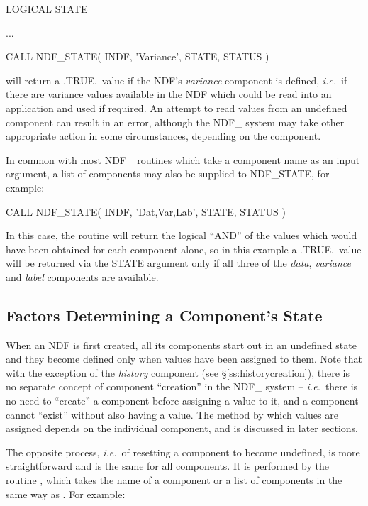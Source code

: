 \documentclass[twoside,11pt,nolof]{starlink}
\providecommand{\st}[1]{{\emph{#1}}}
\begin{document}
\small
\begin{terminalv}
      LOGICAL STATE

      ...

      CALL NDF_STATE( INDF, 'Variance', STATE, STATUS )
\end{terminalv}
\normalsize

will return a .TRUE.\ value if the NDF's \st{variance\/} component is defined,
\st{i.e.}\ if there are variance values available in the NDF which could be read
into an application and used if required.
An attempt to read values from an undefined component can result in an
error, although the NDF\_ system may take other appropriate action in some
circumstances, depending on the component.

In common with most NDF\_ routines which take a component name as an input
argument, a list of components may also be supplied to NDF\_STATE, for
example:

\small
\begin{terminalv}
      CALL NDF_STATE( INDF, 'Dat,Var,Lab', STATE, STATUS )
\end{terminalv}
\normalsize

In this case, the routine will return the logical ``AND'' of the values
which would have been obtained for each component alone, so in this example
a .TRUE.\ value will be returned via the STATE argument only if all three of
the \st{data}, \st{variance\/} and \st{label\/} components are available.

\subsection{\label{ss:reset}Factors Determining a Component's State}

When an NDF is first created, all its components start out in an
undefined state and they become defined only when values have been
assigned to them.  Note that with the exception of the \st{history\/}
component (see \S\ref{ss:historycreation}), there is no separate
concept of component ``creation'' in the NDF\_ system --
\st{i.e.}\ there is no need to ``create'' a component before assigning
a value to
it, and a component cannot ``exist'' without also having a value.  The
method by which values are assigned depends on the individual
component, and is discussed in later sections.

The opposite process, \st{i.e.}\ of resetting a component to become
undefined, is more straightforward and is the same for all components.
It is performed by the routine , which takes the name of a
component or a list of components in the same way as .
For example:
\end{document}

